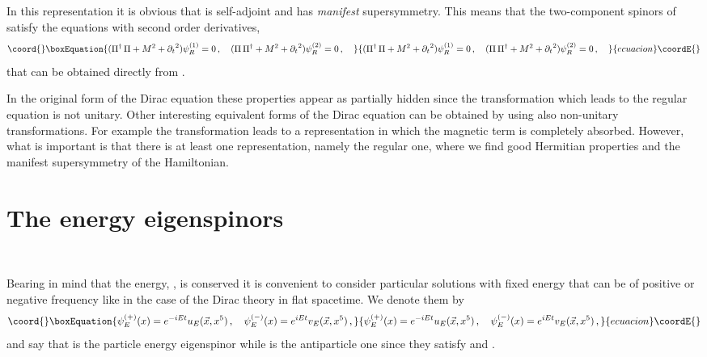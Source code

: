 \documentclass[a4paper,12pt]{article}
\begin{document}
In this representation it is obvious that \coordHE{} is self-adjoint  
and has {\em manifest} supersymmetry. 
This means that the two-component spinors of 
\coordHE{} satisfy 
the equations with second order derivatives,
\begin{equation}\coord{}\boxEquation{
(\Pi^{\dagger}\,\Pi +M^2+{\partial_{t}}^{2})\psi_{R}^{(1)}=0\,,\quad
(\Pi\,\Pi^{\dagger} +M^2+{\partial_{t}}^{2})\psi_{R}^{(2)}=0\,,\quad
}{
(\Pi^{\dagger}\,\Pi +M^2+{\partial_{t}}^{2})\psi_{R}^{(1)}=0\,,\quad
(\Pi\,\Pi^{\dagger} +M^2+{\partial_{t}}^{2})\psi_{R}^{(2)}=0\,,\quad
}{ecuacion}\coordE{}\end{equation}
that can be obtained directly from \coordHE{}.

In the original form of the Dirac equation these properties appear 
as partially hidden since the transformation which leads to the regular 
equation is not unitary. Other interesting equivalent forms of the Dirac 
equation can be obtained by using also non-unitary transformations. For example 
the transformation \coordHE{} leads to a representation 
in which the magnetic term is completely absorbed. However, what is important 
is that there is at least one representation, namely the regular one, where 
we find  good  Hermitian properties and the manifest supersymmetry of the 
Hamiltonian.


\section{The energy eigenspinors}
\

Bearing in mind that the energy, \coordHE{}, is conserved it is convenient to 
consider particular solutions with fixed energy that can be of positive or 
negative frequency like in the case of the Dirac theory in flat spacetime. 
We denote them by
\begin{equation}\coord{}\boxEquation{
\psi_{E}^{(+)}(x)=e^{-iEt}u_{E}(\vec{x},x^{5})\,,\quad  
\psi_{E}^{(-)}(x)=e^{iEt}v_{E}(\vec{x},x^{5})\,,  
}{
\psi_{E}^{(+)}(x)=e^{-iEt}u_{E}(\vec{x},x^{5})\,,\quad  
\psi_{E}^{(-)}(x)=e^{iEt}v_{E}(\vec{x},x^{5})\,,  
}{ecuacion}\coordE{}\end{equation}
and say that \coordHE{} is the particle energy eigenspinor while \coordHE{} is 
the antiparticle one since they satisfy \coordHE{} and \coordHE{}.   
\end{document}
